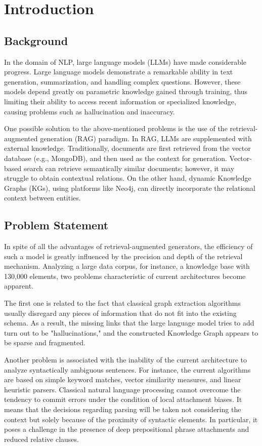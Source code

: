 \chapter{Introduction}

\section{Background}

In the domain of NLP, large language models (LLMs) have made considerable progress. Large language models demonstrate a remarkable ability in text generation, summarization, and handling complex questions. However, these models depend greatly on parametric knowledge gained through training, thus limiting their ability to access recent information or specialized knowledge, causing problems such as hallucination and inaccuracy.

One possible solution to the above-mentioned problems is the use of the retrieval-augmented generation (RAG) paradigm. In RAG, LLMs are supplemented with external knowledge. Traditionally, documents are first retrieved from the vector database (e.g., MongoDB), and then used as the context for generation. Vector-based search can retrieve semantically similar documents; however, it may struggle to obtain contextual relations. On the other hand, dynamic Knowledge Graphs (KGs), using platforms like Neo4j, can directly incorporate the relational context between entities.

\section{Problem Statement}

In spite of all the advantages of retrieval-augmented generators, the efficiency of such a model is greatly influenced by the precision and depth of the retrieval mechanism. Analyzing a large data corpus, for instance, a knowledge base with 130,000 elements, two problems characteristic of current architectures become apparent.

The first one is related to the fact that classical graph extraction algorithms usually disregard any pieces of information that do not fit into the existing schema. As a result, the missing links that the large language model tries to add turn out to be "hallucinations," and the constructed Knowledge Graph appears to be sparse and fragmented.

Another problem is associated with the inability of the current architecture to analyze syntactically ambiguous sentences. For instance, the current algorithms are based on simple keyword matches, vector similarity measures, and linear heuristic parsers. Classical natural language processing cannot overcome the tendency to commit errors under the condition of local attachment biases. It means that the decisions regarding parsing will be taken not considering the context but solely because of the proximity of syntactic elements. In particular, it poses a challenge in the presence of deep prepositional phrase attachments and reduced relative clauses.

